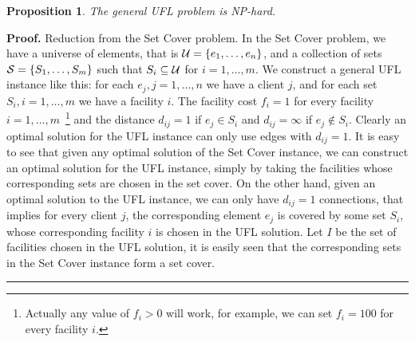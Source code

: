 \documentclass[oneside,final]{ucr}
\newtheorem{proposition}[theorem]{Proposition}
\newenvironment{proof}[1][Proof]{\textbf{#1.} }{\ \rule{0.5em}{0.5em}}
\begin{document}
\begin{proposition}\label{prop:UFLNP}
  The general UFL problem is NP-hard.
\end{proposition}
\begin{proof}
  Reduction from the Set Cover problem. In the Set Cover
  problem, we have a universe of elements, that is $\calU =
  \{e_1, \ldots, e_n\}$, and a collection of sets $\calS =
  \{S_1, \ldots, S_m\}$ such that $S_i \subseteq \calU$ for
  $i=1,\ldots,m$. We construct a general UFL instance like
  this: for each $e_j, j=1,\ldots,n$ we have a client $j$,
  and for each set $S_i, i=1,\ldots,m$ we have a facility
  $i$. The facility cost $f_i=1$ for every facility
  $i=1,\ldots,m$~\footnote{Actually any value of $f_i > 0$
    will work, for example, we can set $f_i=100$ for every
    facility $i$.} and the distance $d_{ij} = 1$ if $e_j \in
  S_i$ and $d_{ij} = \infty$ if $e_j \notin S_i$. Clearly an
  optimal solution for the UFL instance can only use edges
  with $d_{ij} = 1$. It is easy to see that given any
  optimal solution of the Set Cover instance, we can
  construct an optimal solution for the UFL instance, simply
  by taking the facilities whose corresponding sets are
  chosen in the set cover. On the other hand, given an
  optimal solution to the UFL instance, we can only have
  $d_{ij}=1$ connections, that implies for every client $j$,
  the corresponding element $e_j$ is covered by some set
  $S_i$, whose corresponding facility $i$ is chosen in the
  UFL solution. Let $I$ be the set of facilities chosen in
  the UFL solution, it is easily seen that the corresponding
  sets in the Set Cover instance form a set cover.
\end{proof}
\end{document}

